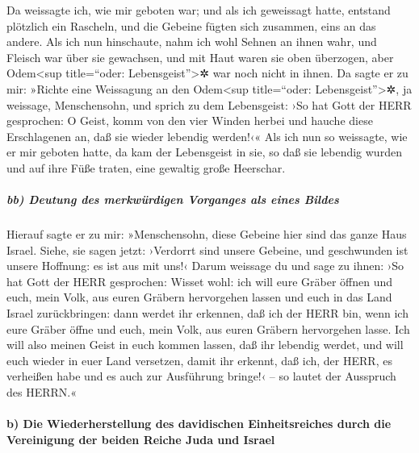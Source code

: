 Da weissagte ich, wie mir geboten war; und als ich
geweissagt hatte, entstand plötzlich ein Rascheln, und die Gebeine
fügten sich zusammen, eins an das andere. Als ich nun
hinschaute, nahm ich wohl Sehnen an ihnen wahr, und Fleisch war über sie
gewachsen, und mit Haut waren sie oben überzogen, aber Odem\textless sup
title=``oder: Lebensgeist''\textgreater✲ war noch nicht in ihnen.
Da sagte er zu mir: »Richte eine Weissagung an den
Odem\textless sup title=``oder: Lebensgeist''\textgreater✲, ja weissage,
Menschensohn, und sprich zu dem Lebensgeist: ›So hat Gott der HERR
gesprochen: O Geist, komm von den vier Winden herbei und hauche diese
Erschlagenen an, daß sie wieder lebendig werden!‹« Als
ich nun so weissagte, wie er mir geboten hatte, da kam der Lebensgeist
in sie, so daß sie lebendig wurden und auf ihre Füße traten, eine
gewaltig große Heerschar.

\hypertarget{bb-deutung-des-merkwuxfcrdigen-vorganges-als-eines-bildes}{%
\subparagraph{bb) Deutung des merkwürdigen Vorganges als eines
Bildes}\label{bb-deutung-des-merkwuxfcrdigen-vorganges-als-eines-bildes}}

Hierauf sagte er zu mir: »Menschensohn, diese Gebeine
hier sind das ganze Haus Israel. Siehe, sie sagen jetzt: ›Verdorrt sind
unsere Gebeine, und geschwunden ist unsere Hoffnung: es ist aus mit
uns!‹ Darum weissage du und sage zu ihnen: ›So hat Gott
der HERR gesprochen: Wisset wohl: ich will eure Gräber öffnen und euch,
mein Volk, aus euren Gräbern hervorgehen lassen und euch in das Land
Israel zurückbringen: dann werdet ihr erkennen, daß ich
der HERR bin, wenn ich eure Gräber öffne und euch, mein Volk, aus euren
Gräbern hervorgehen lasse. Ich will also meinen Geist in
euch kommen lassen, daß ihr lebendig werdet, und will euch wieder in
euer Land versetzen, damit ihr erkennt, daß ich, der HERR, es verheißen
habe und es auch zur Ausführung bringe!‹ -- so lautet der Ausspruch des
HERRN.«

\hypertarget{b-die-wiederherstellung-des-davidischen-einheitsreiches-durch-die-vereinigung-der-beiden-reiche-juda-und-israel}{%
\paragraph{b) Die Wiederherstellung des davidischen Einheitsreiches
durch die Vereinigung der beiden Reiche Juda und
Israel}\label{b-die-wiederherstellung-des-davidischen-einheitsreiches-durch-die-vereinigung-der-beiden-reiche-juda-und-israel}}

